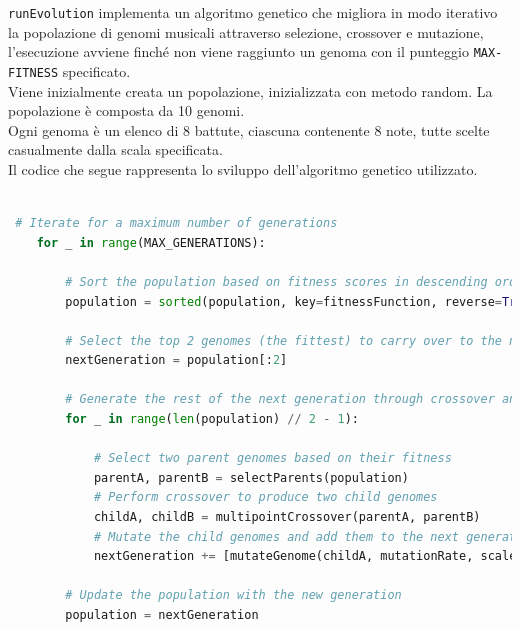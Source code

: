 \documentclass[a4paper,12pt]{report}
\begin{document}
\texttt{runEvolution} implementa un algoritmo genetico che migliora in modo iterativo la popolazione di genomi musicali attraverso selezione, crossover e mutazione, l'esecuzione avviene finché non viene raggiunto un genoma con il punteggio \texttt{MAX-FITNESS} specificato. \\
Viene inizialmente creata un popolazione, inizializzata con metodo random. La popolazione è composta da 10 genomi. \\
Ogni genoma è un elenco di 8 battute, ciascuna contenente 8 note, tutte scelte casualmente dalla scala specificata. \\
Il codice che segue rappresenta lo sviluppo dell'algoritmo genetico utilizzato.

\begin{lstlisting}[language=Python]

 # Iterate for a maximum number of generations
    for _ in range(MAX_GENERATIONS):

        # Sort the population based on fitness scores in descending order
        population = sorted(population, key=fitnessFunction, reverse=True)
        
        # Select the top 2 genomes (the fittest) to carry over to the next generation
        nextGeneration = population[:2]

        # Generate the rest of the next generation through crossover and mutation
        for _ in range(len(population) // 2 - 1):

            # Select two parent genomes based on their fitness
            parentA, parentB = selectParents(population)
            # Perform crossover to produce two child genomes
            childA, childB = multipointCrossover(parentA, parentB)
            # Mutate the child genomes and add them to the next generation
            nextGeneration += [mutateGenome(childA, mutationRate, scale), mutateGenome(childB, mutationRate, scale)]

        # Update the population with the new generation
        population = nextGeneration
        
\end{lstlisting}
\end{document}
